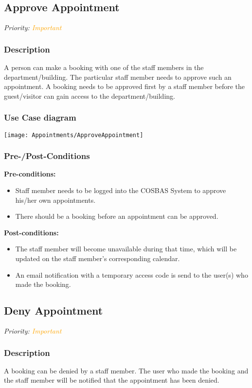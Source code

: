 \subsection{Approve Appointment}
\textit{Priority: \textcolor{orange}{Important}} 

\subsubsection{Description}
A person can make a booking with one of the staff members in the department/building. The particular staff member needs to approve such an appointment. A booking needs to be approved first by a staff member before the guest/visitor can gain access to the department/building.

\subsubsection{Use Case diagram}
\texttt{[image: Appointments/ApproveAppointment]}
\subsubsection{Pre-/Post-Conditions}
\textbf{Pre-conditions:} 
	\begin{itemize}
		\item Staff member needs to be logged into the COSBAS System to approve his/her own appointments.
		\item There should be a booking before an appointment can be approved.
	\end{itemize}
\textbf{ Post-conditions:} 
	\begin{itemize}
		\item The staff member will become unavailable during that time, which will be updated on the staff member's corresponding calendar.
		\item An email notification with a temporary access code is send to the user(s) who made the booking.
	\end{itemize}

\subsection{Deny Appointment}
\textit{Priority: \textcolor{orange}{Important}}

\subsubsection{Description}
A booking can be denied by a staff member. The user who made the booking and the staff member will be notified that the appointment has been denied. 


